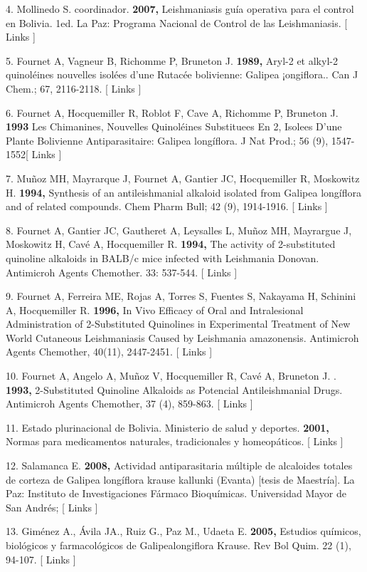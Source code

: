 \documentclass{article}
\begin{document}
4. Mollinedo S. coordinador. \textbf{2007, }
Leishmaniasis guía operativa para el control en Bolivia. 1ed. La Paz: Programa
Nacional de Control de las Leishmaniasis. [ Links ]

5. Fournet A, Vagneur B, Richomme P, Bruneton J. \textbf{1989, }
Aryl-2 et alkyl-2 quinoléines nouvelles isolées d'une Rutacée bolivienne:
Galipea ¡ongiflora.. Can J Chem.; 67, 2116-2118. [ Links ]

6. Fournet A, Hocquemiller R, Roblot F, Cave A, Richomme P, Bruneton J.
\textbf{1993 }
Les Chimanines, Nouvelles Quinoléines Substituees En 2, Isolees D'une Plante
Bolivienne Antiparasitaire: Galipea longíflora. J Nat Prod.; 56 (9), 1547-1552[
Links ]

7. Muñoz MH, Mayrarque J, Fournet A, Gantier JC, Hocquemiller R, Moskowitz H.
\textbf{1994, }
Synthesis of an antileishmanial alkaloid isolated from Galipea longíflora and of
related compounds. Chem Pharm Bull; 42 (9), 1914-1916. [ Links ]

8. Fournet A, Gantier JC, Gautheret A, Leysalles L, Muñoz MH, Mayrargue J,
Moskowitz H, Cavé A, Hocquemiller R. \textbf{1994, }
The activity of 2-substituted quinoline alkaloids in BALB/c mice infected with
Leishmania Donovan. Antimicroh Agents Chemother. 33: 537-544. [ Links ]

9. Fournet A, Ferreira ME, Rojas A, Torres S, Fuentes S, Nakayama H, Schinini A,
Hocquemiller R. \textbf{1996, }
In Vivo Efficacy of Oral and Intralesional Administration of 2-Substituted
Quinolines in Experimental Treatment of New World Cutaneous Leishmaniasis Caused
by Leishmania amazonensis. Antimicroh Agents Chemother, 40(11), 2447-2451. [
Links ]

10. Fournet A, Angelo A, Muñoz V, Hocquemiller R, Cavé A, Bruneton J. .
\textbf{1993, }
2-Substituted Quinoline Alkaloids as Potencial Antileishmanial Drugs. Antimicroh
Agents Chemother, 37 (4), 859-863. [ Links ]

11. Estado plurinacional de Bolivia. Ministerio de salud y deportes.
\textbf{2001, }
Normas para medicamentos naturales, tradicionales y homeopáticos. [ Links ]

12. Salamanca E. \textbf{2008, }
Actividad antiparasitaria múltiple de alcaloides totales de corteza de Galipea
longíflora krause kallunki (Evanta) [tesis de Maestría]. La Paz: Instituto de
Investigaciones Fármaco Bioquímicas. Universidad Mayor de San Andrés; [ Links ]

13. Giménez A., Ávila JA., Ruiz G., Paz M., Udaeta E. \textbf{2005, }
Estudios químicos, biológicos y farmacológicos de Galipealongiflora Krause. Rev
Bol Quim. 22 (1), 94-107. [ Links ]
\end{document}
